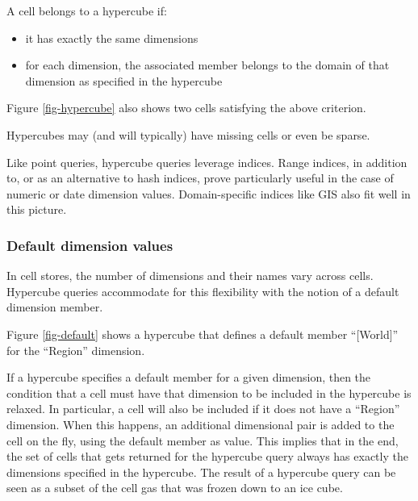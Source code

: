 \documentclass{acm_proc_article-sp}
\begin{document}
A cell belongs to a hypercube if:

\begin{itemize}
\item it has exactly the same dimensions
\item for each dimension, the associated member belongs to the domain of that dimension as specified in the hypercube
\end{itemize}

Figure \ref{fig-hypercube} also shows two cells satisfying the above criterion.

Hypercubes may (and will typically) have missing cells or even be sparse.

Like point queries, hypercube queries leverage indices. Range indices, in addition to, or as an alternative to hash indices, prove particularly useful in the case of numeric or date dimension values. Domain-specific indices like GIS also fit well in this picture.

\subsubsection{Default dimension values}

In cell stores, the number of dimensions and their names vary across cells. Hypercube queries accommodate for this flexibility with the notion of a default dimension member.

Figure \ref{fig-default} shows a hypercube that defines a default member ``[World]'' for the ``Region'' dimension.

If a hypercube specifies a default member for a given dimension, then the condition that a cell must have that dimension to be included in the hypercube is relaxed. In particular, a cell will also be included if it does not have a ``Region'' dimension. When this happens, an additional dimensional pair is added to the cell on the fly, using the default member as value. This implies that in the end, the set of cells that gets returned for the hypercube query always has exactly the dimensions specified in the hypercube. The result of a hypercube query can be seen as a subset of the cell gas that was frozen down to an ice cube.
\end{document}
